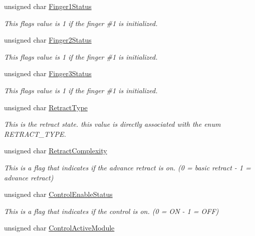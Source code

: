 \begin{DoxyCompactItemize}
\item 
unsigned char \hyperlink{struct_quick_status_a8e58f5a35e358178ac17145661aa9fa3}{Finger1\+Status}
\begin{DoxyCompactList}\small\item\em This flag\textquotesingle{}s value is 1 if the finger \#1 is initialized. \end{DoxyCompactList}\item 
unsigned char \hyperlink{struct_quick_status_a00d03a339f99ef4565b55f157b7d0ebc}{Finger2\+Status}
\begin{DoxyCompactList}\small\item\em This flag\textquotesingle{}s value is 1 if the finger \#1 is initialized. \end{DoxyCompactList}\item 
unsigned char \hyperlink{struct_quick_status_adb0674bfd3b4131c3e2ae0862d5bee50}{Finger3\+Status}
\begin{DoxyCompactList}\small\item\em This flag\textquotesingle{}s value is 1 if the finger \#1 is initialized. \end{DoxyCompactList}\item 
unsigned char \hyperlink{struct_quick_status_a720df4ba846103ada466a72dd8d28142}{Retract\+Type}
\begin{DoxyCompactList}\small\item\em This is the retract state. this value is directly associated with the enum R\+E\+T\+R\+A\+C\+T\+\_\+\+T\+Y\+PE. \end{DoxyCompactList}\item 
unsigned char \hyperlink{struct_quick_status_ab905987dc81a754d7966b71e6c6b31a0}{Retract\+Complexity}
\begin{DoxyCompactList}\small\item\em This is a flag that indicates if the advance retract is on. (0 = basic retract -\/ 1 = advance retract) \end{DoxyCompactList}\item 
unsigned char \hyperlink{struct_quick_status_ab83f9950c5baaae77754d2fd9c42b3f8}{Control\+Enable\+Status}
\begin{DoxyCompactList}\small\item\em This is a flag that indicates if the control is on. (0 = ON -\/ 1 = O\+FF) \end{DoxyCompactList}\item 
unsigned char \hyperlink{struct_quick_status_ab707e183f53af1789d2122a76ebb1786}{Control\+Active\+Module}

\end{DoxyCompactItemize}
